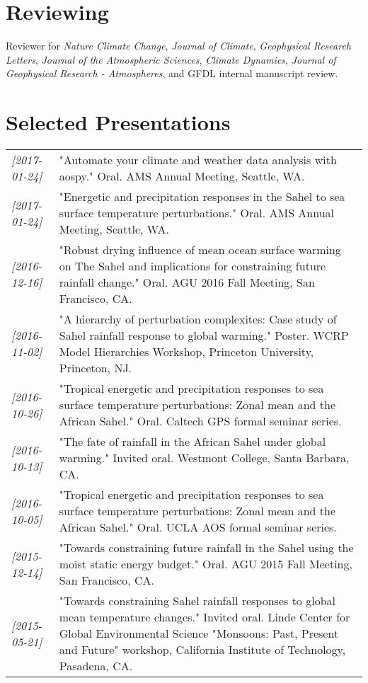 \documentclass[12pt,letterpaper]{shillcv}
\begin{document}
\section*{Reviewing}
\label{sec:org85efa1c}
Reviewer for \emph{Nature Climate Change}, \emph{Journal of Climate}, \emph{Geophysical Research
Letters}, \emph{Journal of the Atmospheric Sciences}, \emph{Climate Dynamics}, \emph{Journal of
Geophysical Research - Atmospheres}, and GFDL internal manuscript review.
\section*{Selected Presentations}
\label{sec:orga4369df}
\begin{center}
\begin{tabularx}{\textwidth}{lX}
\textit{[2017-01-24]} & "Automate your climate and weather data analysis with aospy."  Oral.  AMS Annual Meeting, Seattle, WA.\\
\textit{[2017-01-24]} & "Energetic and precipitation responses in the Sahel to sea surface temperature perturbations."  Oral.  AMS Annual Meeting, Seattle, WA.\\
\textit{[2016-12-16]} & "Robust drying influence of mean ocean surface warming on The Sahel and implications for constraining future rainfall change."  Oral.  AGU 2016 Fall Meeting, San Francisco, CA.\\
\textit{[2016-11-02]} & "A hierarchy of perturbation complexites: Case study of Sahel rainfall response to global warming."  Poster.  WCRP Model Hierarchies Workshop, Princeton University, Princeton, NJ.\\
\textit{[2016-10-26]} & "Tropical energetic and precipitation responses to sea surface temperature perturbations: Zonal mean and the African Sahel."  Oral.  Caltech GPS formal seminar series.\\
\textit{[2016-10-13]} & "The fate of rainfall in the African Sahel under global warming."  Invited oral.  Westmont College, Santa Barbara, CA.\\
\textit{[2016-10-05]} & "Tropical energetic and precipitation responses to sea surface temperature perturbations: Zonal mean and the African Sahel."  Oral.  UCLA AOS formal seminar series.\\
\textit{[2015-12-14]} & "Towards constraining future rainfall in the Sahel using the moist static energy budget." Oral.  AGU 2015 Fall Meeting, San Francisco, CA.\\
\textit{[2015-05-21]} & "Towards constraining Sahel rainfall responses to global mean temperature changes."  Invited oral.  Linde Center for Global Environmental Science "Monsoons: Past, Present and Future" workshop, California Institute of Technology, Pasadena, CA.\\

\end{tabularx}
\end{center}
\end{document}
